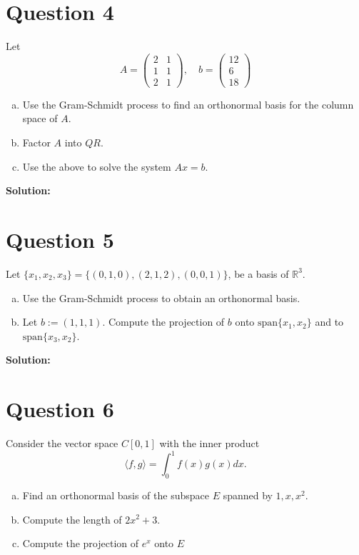\documentclass{article}
\begin{document}
\newpage
\section*{Question 4}
Let 
$$ A = \begin{pmatrix} 2 & 1 \\ 1 & 1 \\ 2 & 1 \end{pmatrix}, \quad
   b = \begin{pmatrix} 12 \\ 6 \\ 18 \end{pmatrix} $$
\begin{enumerate}[a.]
    \item Use the Gram-Schmidt process to find an orthonormal basis for the column space of $A$.
    \item Factor $A$ into $QR$.
    \item Use the above to solve the system $Ax = b$.
\end{enumerate}

\vspace{0.25cm}\noindent\textbf{Solution:}

\section*{Question 5}
Let $\{x_1, x_2, x_3\} = \{(0, 1, 0), (2, 1, 2), (0, 0, 1)\}$, be a basis of $\mathbb{R}^3$.
\begin{enumerate}[a.]
    \item Use the Gram-Schmidt process to obtain an orthonormal basis.
    \item Let $ b := (1, 1, 1) $. Compute the projection of $ b $ onto $\text{span}\{x_1, x_2\}$ and to $\text{span}\{x_3, x_2\}$.
\end{enumerate}

\vspace{0.25cm}\noindent\textbf{Solution:}

\section*{Question 6}
Consider the vector space \(C[0,1]\) with the inner product
$$ \langle f, g \rangle = \int_{0}^{1} f(x)g(x)dx. $$
\begin{enumerate}[a.]
    \item Find an orthonormal basis of the subspace \(E\) spanned by \(1, x, x^2\).
    \item Compute the length of \(2x^2 + 3\).
    \item Compute the projection of \(e^x\) onto \(E\)
\end{enumerate}
\end{document}
